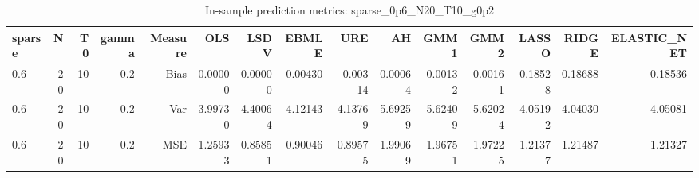 \begin{table}[!htbp]\centering
\caption{In-sample prediction metrics: sparse_0p6_N20_T10_g0p2}
\label{tab:table2_sparse_0p6_N20_T10_g0p2}
\begin{tabular}{lrrrrrrrrrrrrrr}
\hline
sparse & N & T0 & gamma & Measure & OLS & LSDV & EBMLE & URE & AH & GMM1 & GMM2 & LASSO & RIDGE & ELASTIC_NET \\
\hline
0.6 & 20 & 10 & 0.2 & Bias & 0.00000 & 0.00000 & 0.00430 & -0.00314 & 0.00064 & 0.00132 & 0.00161 & 0.18528 & 0.18688 & 0.18536 \\
0.6 & 20 & 10 & 0.2 & Var & 3.99730 & 4.40064 & 4.12143 & 4.13769 & 5.69259 & 5.62409 & 5.62024 & 4.05192 & 4.04030 & 4.05081 \\
0.6 & 20 & 10 & 0.2 & MSE & 1.25933 & 0.85851 & 0.90046 & 0.89575 & 1.99069 & 1.96751 & 1.97225 & 1.21377 & 1.21487 & 1.21327 \\
\hline
\end{tabular}
\end{table}

